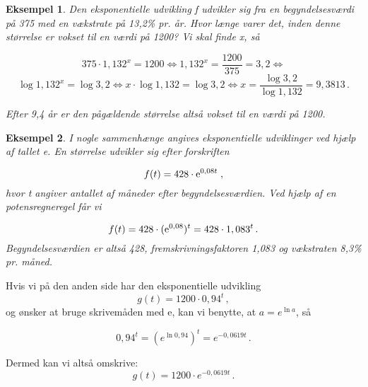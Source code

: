 \documentclass[12pt,oneside,a4paper]{article}
\theoremstyle{plain}
\newtheorem*{eks}{Eksempel}
\begin{document}
\begin{eks}
Den eksponentielle udvikling f udvikler sig fra en begyndelsesværdi på 375 med
en vækstrate på 13,2\% pr. år. Hvor længe varer det, inden denne størrelse er
vokset til en værdi på 1200? Vi skal finde x, så

\[
375 \cdot 1,132^x = 1200 \iff
    1,132^x = \frac{1200}{375} = 3,2 \iff
    \]
\[
    \log 1,132^x = \log 3,2 \iff
    x \cdot \log 1,132 = \log 3,2 \iff
    x = \frac{\log 3,2}{\log 1,132} = 9,3813\,.
\]

Efter 9,4 år er den pågældende størrelse altså vokset til en værdi på 1200.
\end{eks}


\begin{eks}

    I nogle sammenhænge angives eksponentielle udviklinger ved hjælp af tallet {\rm e}.
En størrelse udvikler sig efter forskriften

\[
    f(t) = 428 \cdot {\rm e}^{0,08t} \; ,
\]
hvor t angiver antallet af måneder efter begyndelsesværdien. Ved hjælp af en
potensregneregel får vi

\[
    f(t) = 428 \cdot ({\rm e}^{0,08})^t = 428 \cdot 1,083^t \, .
\]
Begyndelsesværdien er altså 428, fremskrivningsfaktoren 1,083 og vækstraten
8,3\% pr. måned.
\end{eks}

Hvis vi på den anden side har den eksponentielle udvikling 
\[
    g(t) = 1200 \cdot 0,94^t\,,
    \]
og ønsker at bruge skrivemåden med e, kan vi benytte, at  $a = e^{\ln a}$, så 

\[
0,94^t = (e^{\ln 0,94})^t = e^{-0,0619t} \, .
\]

Dermed kan vi altså omskrive:
\[
    g(t) = 1200 \cdot e^{-0,0619t} \, .
\]
\end{document}
